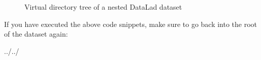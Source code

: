 \begin{figure}[tbp]
\centering
\capstart

\noindent{}
\caption{Virtual directory tree of a nested DataLad dataset}\label{\detokenize{basics/101-106-nesting:id1}}\label{\detokenize{basics/101-106-nesting:fignesting}}\end{figure}

\sphinxAtStartPar
If you have executed the above code snippets, make sure to go back into the
root of the dataset again:

\begin{sphinxVerbatim}[commandchars=\\\{\}]
../../
\end{sphinxVerbatim}

\sphinxstepscope


